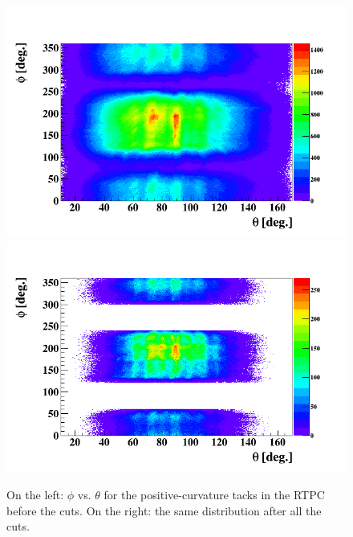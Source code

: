 \begin{figure}[tbp]
\hspace{-0.2in}
\includegraphics[scale=0.35]{fig_analysis/rtpc_phi_theta_1.png}
\includegraphics[scale=0.35]{fig_analysis/rtpc_phi_theta_2.png}
\caption{On the left: $\phi$ vs. $\theta$ for the positive-curvature tacks in the RTPC before the cuts. On the right: the same distribution after all the cuts.} 
\label{fig:rtpc_phi_theta}
\end{figure}

